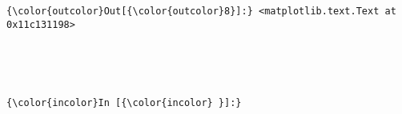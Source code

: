 \documentclass[11pt]{article}
\begin{document}
\begin{Verbatim}[commandchars=\\\{\}]
{\color{outcolor}Out[{\color{outcolor}8}]:} <matplotlib.text.Text at 0x11c131198>
\end{Verbatim}
            
    \begin{center}
    \end{center}
    { \hspace*{\fill} \\}
    
    \begin{center}
    \end{center}
    { \hspace*{\fill} \\}
    
    \begin{Verbatim}[commandchars=\\\{\}]
{\color{incolor}In [{\color{incolor} }]:} 
\end{Verbatim}


    
    
    
    
\end{document}
